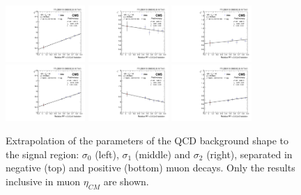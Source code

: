 \begin{figure}[!htbp]
 \begin{center}
  \includegraphics[width=0.27\textwidth]{Figures/WBoson/Analysis/SignalExtraction/QCD_Template/EXTRAPOLATION/PA/graph_Sigma0_QCDToMuMi_PA_-29_eta_19_250_pt_1000000.pdf}
  \includegraphics[width=0.27\textwidth]{Figures/WBoson/Analysis/SignalExtraction/QCD_Template/EXTRAPOLATION/PA/graph_Sigma1_QCDToMuMi_PA_-29_eta_19_250_pt_1000000.pdf}
  \includegraphics[width=0.27\textwidth]{Figures/WBoson/Analysis/SignalExtraction/QCD_Template/EXTRAPOLATION/PA/graph_Sigma2_QCDToMuMi_PA_-29_eta_19_250_pt_1000000.pdf}
  \includegraphics[width=0.27\textwidth]{Figures/WBoson/Analysis/SignalExtraction/QCD_Template/EXTRAPOLATION/PA/graph_Sigma0_QCDToMuPl_PA_-29_eta_19_250_pt_1000000.pdf}
  \includegraphics[width=0.27\textwidth]{Figures/WBoson/Analysis/SignalExtraction/QCD_Template/EXTRAPOLATION/PA/graph_Sigma1_QCDToMuPl_PA_-29_eta_19_250_pt_1000000.pdf}
  \includegraphics[width=0.27\textwidth]{Figures/WBoson/Analysis/SignalExtraction/QCD_Template/EXTRAPOLATION/PA/graph_Sigma2_QCDToMuPl_PA_-29_eta_19_250_pt_1000000.pdf}
 \end{center}
 \caption{Extrapolation of the parameters of the QCD background shape to the signal region: $\sigma_{0}$ (left), $\sigma_{1}$ (middle) and $\sigma_{2}$ (right), separated in negative (top) and positive (bottom) muon decays. Only the results inclusive in muon $\eta_{CM}$ are shown.}
 \label{fig:QCD_Extrapolation}
\end{figure}

